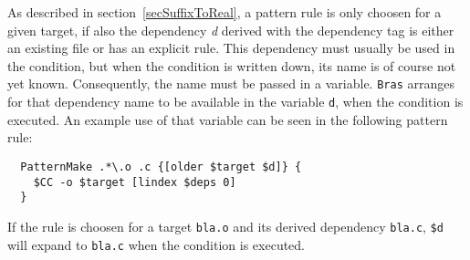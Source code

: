 \documentclass[11pt]{scrartcl}
\newcommand{\bras}{\texttt{bras}}
\newcommand{\Bras}{\texttt{Bras}}
\newcommand{\make}{\texttt{make}}
\begin{document}
As described in section~\ref{secSuffixToReal}, a pattern rule is only
choosen for a given target, if also the dependency \textit{d} derived
with the dependency tag is either an existing file or has an explicit
rule. This dependency must usually be used in the condition, but when
the condition is written down, its name is of course not yet
known. Consequently, the name must be passed in a variable. \Bras{}
arranges for that dependency name to be available in the variable
\texttt{d}, when the condition is executed. An example use of that
variable can be seen in the following pattern rule:
\begin{verbatim}
  PatternMake .*\.o .c {[older $target $d]} {
    $CC -o $target [lindex $deps 0]
  }
\end{verbatim}
If the rule is choosen for a target \texttt{bla.o} and its derived
dependency \texttt{bla.c}, \texttt{\$d} will expand to \texttt{bla.c}
when the condition is executed.




\end{document}
